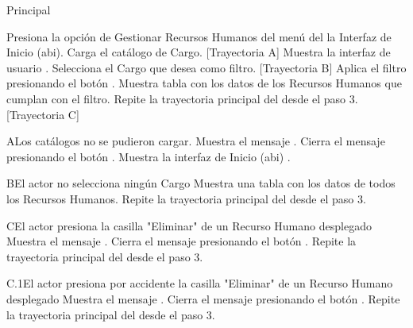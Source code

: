 \begin{UCtrayectoria}{Principal}

    \UCpaso[\UCactor] Presiona la opción de Gestionar Recursos Humanos del menú del la Interfaz de Inicio (abi).
    \UCpaso Carga el catálogo de Cargo. [Trayectoria A]
    \UCpaso Muestra la interfaz de usuario .
    \UCpaso[\UCactor] Selecciona el Cargo que desea como filtro. [Trayectoria B]
    \UCpaso[\UCactor] Aplica el filtro presionando el botón .
    \UCpaso Muestra tabla con los datos de los Recursos Humanos que cumplan con el filtro.
    \UCpaso Repite la trayectoria principal del  desde el paso 3. [Trayectoria C]
\end{UCtrayectoria}


\begin{UCtrayectoriaA}{A}{Los catálogos no se pudieron cargar.}
    \UCpaso Muestra el mensaje .
    \UCpaso[\UCactor] Cierra el mensaje presionando el botón .
    \UCpaso Muestra la interfaz de Inicio (abi) .
\end{UCtrayectoriaA}


\begin{UCtrayectoriaA}{B}{El actor no selecciona ningún Cargo}
    \UCpaso Muestra una tabla con los datos de todos los Recursos Humanos.
    \UCpaso Repite la trayectoria principal del  desde el paso 3.

\end{UCtrayectoriaA}


\begin{UCtrayectoriaA}{C}{El actor presiona la casilla "Eliminar" de un Recurso Humano desplegado}
    \UCpaso Muestra el mensaje .
    \UCpaso[\UCactor] Cierra el mensaje presionando el botón .
    \UCpaso Repite la trayectoria principal del  desde el paso 3.
\end{UCtrayectoriaA}

\begin{UCtrayectoriaA}{C.1}{El actor presiona por accidente la casilla "Eliminar" de un Recurso Humano desplegado}
    \UCpaso Muestra el mensaje .
    \UCpaso[\UCactor] Cierra el mensaje presionando el botón .
    \UCpaso Repite la trayectoria principal del  desde el paso 3.
\end{UCtrayectoriaA}

